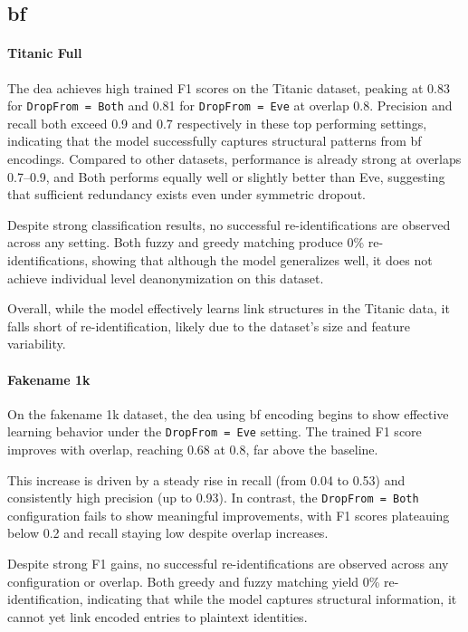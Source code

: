 \subsection{\ac{bf}}

\paragraph{Titanic Full}

The \ac{dea} achieves high trained F1 scores on the Titanic dataset, peaking at 0.83 for \texttt{DropFrom = Both} and 0.81 for \texttt{DropFrom = Eve} at overlap 0.8.
Precision and recall both exceed 0.9 and 0.7 respectively in these top performing settings, indicating that the model successfully captures structural patterns from \ac{bf} encodings.
Compared to other datasets, performance is already strong at overlaps 0.7–0.9, and Both performs equally well or slightly better than Eve, suggesting that sufficient redundancy exists even under symmetric dropout.

Despite strong classification results, no successful re-identifications are observed across any setting.
Both fuzzy and greedy matching produce 0\% re-identifications, showing that although the model generalizes well, it does not achieve individual level deanonymization on this dataset.

Overall, while the model effectively learns link structures in the Titanic data, it falls short of re-identification, likely due to the dataset’s size and feature variability.


\paragraph{Fakename 1k}

On the fakename 1k dataset, the \ac{dea} using \ac{bf} encoding begins to show effective learning behavior under the \texttt{DropFrom = Eve} setting.
The trained F1 score improves with overlap, reaching 0.68 at 0.8, far above the baseline.

This increase is driven by a steady rise in recall (from 0.04 to 0.53) and consistently high precision (up to 0.93).
In contrast, the \texttt{DropFrom = Both} configuration fails to show meaningful improvements, with F1 scores plateauing below 0.2 and recall staying low despite overlap increases.

Despite strong F1 gains, no successful re-identifications are observed across any configuration or overlap.
Both greedy and fuzzy matching yield 0\% re-identification, indicating that while the model captures structural information, it cannot yet link encoded entries to plaintext identities.

